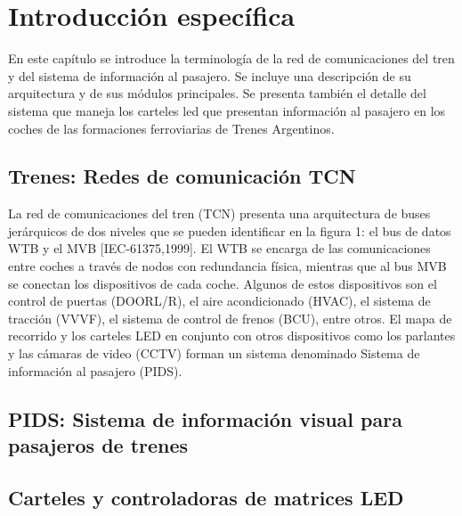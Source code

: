 \chapter{Introducción específica} %

\label{Chapter2}

En este capítulo se introduce la terminología de la red de comunicaciones del tren y del sistema de información al pasajero. Se incluye una descripción de su arquitectura y de sus módulos principales. Se presenta también el detalle del sistema que maneja los carteles led que presentan información al pasajero en los coches de las formaciones ferroviarias de Trenes Argentinos.\\



\section{Trenes: Redes de comunicación TCN}

La red de comunicaciones del tren (TCN) presenta una arquitectura de buses jerárquicos de dos niveles que se pueden identificar en la figura 1: el bus de datos WTB y el MVB [IEC-61375,1999]. El WTB se encarga de las comunicaciones entre coches a través de nodos con redundancia física, mientras que al bus MVB se conectan los dispositivos de cada coche. Algunos de estos dispositivos son el control de puertas (DOORL/R), el aire acondicionado (HVAC), el sistema de tracción (VVVF), el sistema de control de frenos (BCU), entre otros. El mapa de recorrido y los carteles LED en conjunto con otros dispositivos como los parlantes y las cámaras de video (CCTV) forman un sistema denominado Sistema de información al pasajero (PIDS).


\pagebreak
\section{PIDS: Sistema de información visual para pasajeros de trenes}

\pagebreak
\section{Carteles y controladoras de matrices LED}
